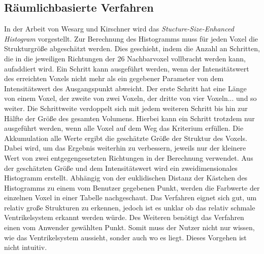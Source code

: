 \subsection{Räumlichbasierte Verfahren}

In der Arbeit von Wesarg und Kirschner \cite{wesarg2009structure, wesarg20102d} wird das \textit{Stucture-Size-Enhanced Histogram} vorgestellt.
\newline
Zur Berechnung des Histogramms  muss für jeden Voxel die Strukturgröße abgeschätzt werden. Dies geschieht, indem die Anzahl an Schritten, die in die jeweiligen Richtungen der 26 Nachbarvoxel vollbracht werden kann, aufaddiert wird. Ein Schritt kann ausgeführt werden, wenn der Intensitätswert des erreichten Voxels nicht mehr als ein gegebener Parameter von dem Intensitätswert des Ausgangspunkt abweicht.
\newline
Der erste Schritt hat eine Länge von einem Voxel, der zweite von zwei Voxeln, der dritte von vier Voxeln... und so weiter. Die Schrittweite verdoppelt sich mit jedem weiteren Schritt bis hin zur Hälfte der Größe des gesamten Volumens. Hierbei kann ein Schritt trotzdem nur ausgeführt werden, wenn alle Voxel auf dem Weg das Kriterium erfüllen. Die Akkumulation alle Werte ergibt die geschätzte Größe der Struktur des Voxels. Dabei wird, um das Ergebnis weiterhin zu verbessern,  jeweils nur der kleinere Wert von zwei entgegengesetzten Richtungen in der Berechnung verwendet. 
\newline
Aus der geschätzten Größe und dem Intensitätswert wird ein zweidimensionales Histogramm erstellt. Abhängig von der euklidischen Distanz der Kästchen des Histogramms zu einem vom Benutzer gegebenen Punkt, werden die Farbwerte der einzelnen Voxel in einer Tabelle nachgeschaut.
\newline
Das Verfahren eignet sich gut, um relativ große Strukturen zu erkennen, jedoch ist es unklar ob das relativ schmale Ventrikelsystem erkannt werden würde. Des Weiteren benötigt das Verfahren einen vom Anwender gewählten Punkt. Somit muss der Nutzer nicht nur wissen, wie das Ventrikelsystem aussieht, sonder auch wo es liegt. Dieses Vorgehen ist nicht intuitiv.



